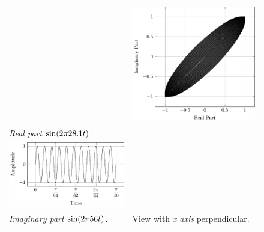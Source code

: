 \documentclass[../../course]{subfiles}
\begin{document}
\begin{figure} [H]
\begin{NiceTabularX} {\textwidth} {
            *{2}{>{\centering\arraybackslash}X}
        }
        &

         {
             {
                \includegraphics[height = \textheight] {tikzpics/plotFrontViewComplexF.pdf}
            }
        }

        \\

         {\emph{Real part} $\sin(2 \pi 28.1 t)$.}
        \label{plt:realCmplxF}

        &
        \\

         {
             {
                \includegraphics[height = \textheight] {tikzpics/plotShortX3.pdf}
            }
        }

        &
        \\

         {\emph{Imaginary part} $\sin(2 \pi 56 t)$.}
        \label{plt:imagCmplxF}

        &

         {View with \emph{x axis} perpendicular.}
        \label{plt:frontViewCmplxF}

        \\

    \end{NiceTabularX}

\end{figure}
\end{document}
